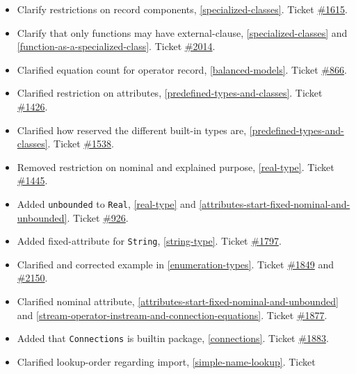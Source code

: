 \begin{itemize}
\item
  Clarify restrictions on record components, \cref{specialized-classes}. Ticket
  \href{https://github.com/modelica/ModelicaSpecification/issues/1615}{\#1615}.
\item
  Clarify that only functions may have external-clause, \cref{specialized-classes} and \cref{function-as-a-specialized-class}.
  Ticket \href{https://github.com/modelica/ModelicaSpecification/issues/2014}{\#2014}.
\item
  Clarified equation count for operator record, \cref{balanced-models}. Ticket
  \href{https://github.com/modelica/ModelicaSpecification/issues/866}{\#866}.
\item
  Clarified restriction on attributes, \cref{predefined-types-and-classes}. Ticket
  \href{https://github.com/modelica/ModelicaSpecification/issues/1426}{\#1426}.
\item
  Clarified how reserved the different built-in types are, \cref{predefined-types-and-classes}.
  Ticket \href{https://github.com/modelica/ModelicaSpecification/issues/1538}{\#1538}.
\item
  Removed restriction on nominal and explained purpose, \cref{real-type}.
  Ticket \href{https://github.com/modelica/ModelicaSpecification/issues/1445}{\#1445}.
\item
  Added \lstinline!unbounded! to \lstinline!Real!, \cref{real-type} and \cref{attributes-start-fixed-nominal-and-unbounded}.
  Ticket \href{https://github.com/modelica/ModelicaSpecification/issues/926}{\#926}.
\item
  Added fixed-attribute for \lstinline!String!, \cref{string-type}.
  Ticket \href{https://github.com/modelica/ModelicaSpecification/issues/1797}{\#1797}.
\item
  Clarified and corrected example in \cref{enumeration-types}. Ticket
  \href{https://github.com/modelica/ModelicaSpecification/issues/1849}{\#1849} and
  \href{https://github.com/modelica/ModelicaSpecification/issues/2150}{\#2150}.
\item
  Clarified nominal attribute, \cref{attributes-start-fixed-nominal-and-unbounded}
  and \cref{stream-operator-instream-and-connection-equations}. Ticket
  \href{https://github.com/modelica/ModelicaSpecification/issues/1877}{\#1877}.
\item
  Added that \lstinline!Connections! is builtin package, \cref{connections}. Ticket
  \href{https://github.com/modelica/ModelicaSpecification/issues/1883}{\#1883}.
\item
  Clarified lookup-order regarding import, \cref{simple-name-lookup}. Ticket

\end{itemize}
